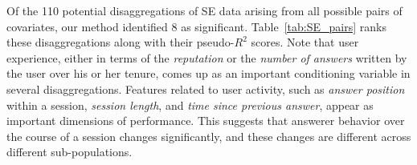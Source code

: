 \documentclass[letterpaper]{article} %
\begin{document}
\begin{table}
  \caption{Variables defining important disaggregations of Stack Exchange data, along with their pseudo-$R^2$ scores.}
  \label{tab:SE_pairs}
  \begin{center}
\end{center}
\end{table}
Of the 110 potential disaggregations of SE data arising from all possible pairs of covariates, our method identified 8 as significant. Table~\ref{tab:SE_pairs} ranks these disaggregations %
along with their pseudo-$R^2$ scores.
Note that user experience, either in terms of the \emph{reputation} or the \emph{number of answers} written by the user over his or her tenure, comes up as an important conditioning variable in several disaggregations. Features related to user activity, such as \emph{answer position} within a session, \emph{session length}, and \emph{time since previous answer}, appear as important dimensions of performance.
This suggests that answerer behavior over the course of a session changes significantly, and these changes are different across different sub-populations. %
\end{document}
